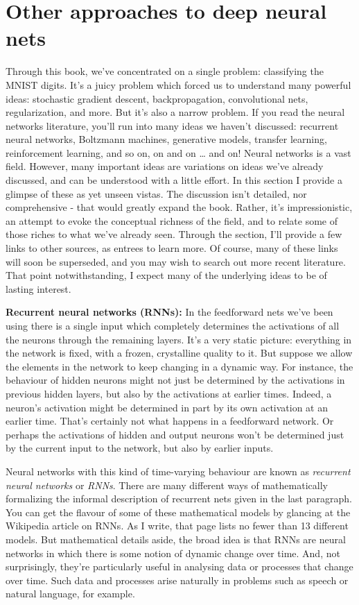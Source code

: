 \documentclass[a4paper,twoside,10pt]{book}
\begin{document}
\section{Other approaches to deep neural nets}
Through this book, we've concentrated on a single problem: classifying the MNIST digits. It's a juicy problem which forced us to understand many powerful ideas: stochastic gradient descent, backpropagation, convolutional nets, regularization, and more. But it's also a narrow problem. If you read the neural networks literature, you'll run into many ideas we haven't discussed: recurrent neural networks, Boltzmann machines, generative models, transfer learning, reinforcement learning, and so on, on and on … and on! Neural networks is a vast field. However, many important ideas are variations on ideas we've already discussed, and can be understood with a little effort. In this section I provide a glimpse of these as yet unseen vistas. The discussion isn't detailed, nor comprehensive - that would greatly expand the book. Rather, it's impressionistic, an attempt to evoke the conceptual richness of the field, and to relate some of those riches to what we've already seen. Through the section, I'll provide a few links to other sources, as entrees to learn more. Of course, many of these links will soon be superseded, and you may wish to search out more recent literature. That point notwithstanding, I expect many of the underlying ideas to be of lasting interest.

\textbf{Recurrent neural networks (RNNs):} In the feedforward nets we've been using there is a single input which completely determines the activations of all the neurons through the remaining layers. It's a very static picture: everything in the network is fixed, with a frozen, crystalline quality to it. But suppose we allow the elements in the network to keep changing in a dynamic way. For instance, the behaviour of hidden neurons might not just be determined by the activations in previous hidden layers, but also by the activations at earlier times. Indeed, a neuron's activation might be determined in part by its own activation at an earlier time. That's certainly not what happens in a feedforward network. Or perhaps the activations of hidden and output neurons won't be determined just by the current input to the network, but also by earlier inputs.

Neural networks with this kind of time-varying behaviour are known as \textit{recurrent neural networks} or \textit{RNNs}. There are many different ways of mathematically formalizing the informal description of recurrent nets given in the last paragraph. You can get the flavour of some of these mathematical models by glancing at the Wikipedia article on RNNs. As I write, that page lists no fewer than 13 different models. But mathematical details aside, the broad idea is that RNNs are neural networks in which there is some notion of dynamic change over time. And, not surprisingly, they're particularly useful in analysing data or processes that change over time. Such data and processes arise naturally in problems such as speech or natural language, for example.
\end{document}
